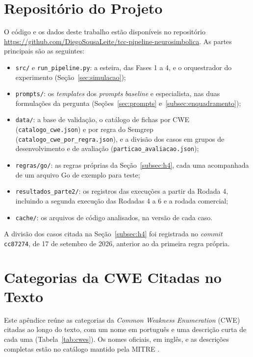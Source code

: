 \begin{apendicesenv}


\chapter{Repositório do Projeto}
\label{ap:repositorio}

O código e os dados deste trabalho estão disponíveis no repositório \url{https://github.com/DiegoSousaLeite/tcc-pipeline-neurosimbolica}. As partes principais são as seguintes:

\begin{itemize}
    \item \texttt{src/} e \texttt{run\_pipeline.py}: a esteira, das Fases 1 a 4, e o orquestrador do experimento (Seção~\ref{sec:simulacao});
    \item \texttt{prompts/}: os \textit{templates} dos \textit{prompts} \textit{baseline} e especialista, nas duas formulações da pergunta (Seções~\ref{sec:prompts} e~\ref{subsec:enquadramento});
    \item \texttt{data/}: a base de validação, o catálogo de fichas por CWE (\texttt{catalogo\_cwe.json}) e por regra do Semgrep (\texttt{catalogo\_cwe\_por\_regra.json}), e a divisão dos casos em grupos de desenvolvimento e de avaliação (\texttt{particao\_avaliacao.json});
    \item \texttt{regras/go/}: as regras próprias da Seção~\ref{subsec:h4}, cada uma acompanhada de um arquivo Go de exemplo para teste;
    \item \texttt{resultados\_parte2/}: os registros das execuções a partir da Rodada 4, incluindo a segunda execução das Rodadas 4 a 6 e a rodada comercial;
    \item \texttt{cache/}: os arquivos de código analisados, na versão de cada caso.
\end{itemize}

A divisão dos casos citada na Seção~\ref{subsec:h4} foi registrada no \textit{commit} \texttt{cc87274}, de 17 de setembro de 2026, anterior ao da primeira regra própria.

\chapter{Categorias da CWE Citadas no Texto}
\label{ap:cwes}

Este apêndice reúne as categorias da \textit{Common Weakness Enumeration} (CWE) citadas ao longo do texto, com um nome em português e uma descrição curta de cada uma (Tabela~\ref{tab:cwes}). Os nomes oficiais, em inglês, e as descrições completas estão no catálogo mantido pela MITRE \cite{mitrecwe}.


\end{apendicesenv}
